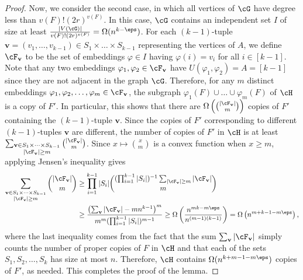 \begin{proof}
Now, we consider the second case, in which all vertices of $\cG$ have degree less than $v(F)!(2r)^{v(F)}$. In this case, $\cG$ contains an independent set $I$ of size at least $\frac{|V(\cG)|}{v(F)!(2r)^{v(F)}}=\Omega(n^{k-\eps})$. For each $(k-1)$-tuple $\mathbf{v}=(v_1, \dots, v_{k-1})\in S_1\times\dots\times S_{k-1}$ representing the vertices of $A$, we define $\cF_{\mathbf{v}}$ to be the set of embeddings $\varphi\in I$ having $\varphi(i)=v_i$ for all $i\in [k-1]$. Note that any two embeddings $\varphi_1, \varphi_2\in \cF_{\mathbf{v}}$ have $U(\varphi_1, \varphi_2)=A=[k-1]$ since they are not adjacent in the graph $\cG$. Therefore, for any $m$ distinct embeddings $\varphi_1, \varphi_2, \ldots, \varphi_m \in \cF_{\mathbf{v}}$, the subgraph $\varphi_1(F)\cup \ldots \cup \varphi_m(F)$ of $\cH$ is a copy of $F'$. In particular, this shows that there are $\Omega\left(\binom{|\cF_{\mathbf{v}}|}{m}\right)$ copies of $F'$ containing the $(k-1)$-tuple $\mathbf{v}$. Since the copies of $F'$ corresponding to different $(k-1)$-tuples $\mathbf{v}$ are different, the number of copies of $F'$ in $\cH$ is at least $\sum_{\substack{\mathbf{v}\in S_1\times\cdots\times S_{k-1}\\|\cF_{\mathbf{v}}|\geq m}} \binom{|\cF_{\mathbf{v}}|}{m}$. Since $x\mapsto \binom{x}{m}$ is a convex function when $x\geq m$, applying Jensen's inequality gives
\begin{align*}
    \sum_{\substack{\mathbf{v}\in S_1\times\cdots\times S_{k-1}\\|\cF_{\mathbf{v}}|\geq m}} \binom{|\cF_{\mathbf{v}}|}{m}&\geq \prod_{i=1}^{k-1}|S_i|\binom{(\prod_{i=1}^{k-1}|S_i|)^{-1}\sum_{|\cF_{\mathbf{v}}|\geq m} |\cF_{\mathbf{v}}|}{m} \\&\geq \frac{\left(\sum_{\mathbf{v}} |\cF_{\mathbf{v}}|-mn^{k-1}\right)^m}{m^m (\prod_{i=1}^{k-1}|S_i|)^{m-1}}
    \geq \Omega\left(\frac{n^{mk-m\eps}}{n^{(m-1)(k-1)}}\right)= \Omega\left(n^{m+k-1-m\eps}\right),
\end{align*}
where the last inequality comes from the fact that the sum $\sum_{\mathbf{v}} |\cF_{\mathbf{v}}|$ simply counts the number of proper copies of $F$ in $\cH$ and that each of the sets $S_1, S_2, \ldots, S_k$ has size at most $n$. Therefore, $\cH$ contains $\Omega(n^{k+m-1-m\eps})$ copies of $F'$, as needed. This completes the proof of the lemma.
\end{proof}


